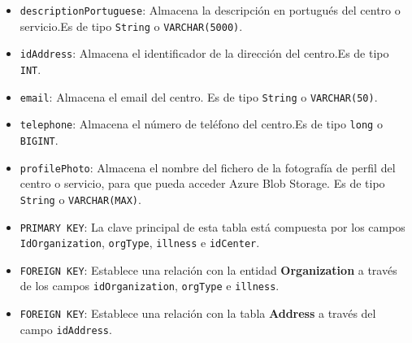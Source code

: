 \begin{itemize}
\begin{itemize}
        \item \texttt{descriptionPortuguese}: Almacena la descripción en portugués del centro o servicio.Es de tipo \texttt{String} o \texttt{VARCHAR(5000)}.        
        \item \texttt{idAddress}: Almacena el identificador de la dirección del centro.Es de tipo \texttt{INT}.
        \item \texttt{email}: Almacena el email del centro. Es de tipo \texttt{String} o \texttt{VARCHAR(50)}.
        \item \texttt{telephone}: Almacena el número de teléfono del centro.Es de tipo \texttt{long} o \texttt{BIGINT}.
        \item \texttt{profilePhoto}: Almacena el nombre del fichero de la fotografía de perfil del centro o servicio, para que pueda acceder Azure Blob Storage. Es de tipo \texttt{String} o \texttt{VARCHAR(MAX)}.
        \item \texttt{PRIMARY KEY}: La clave principal de esta tabla está compuesta por los campos \texttt{IdOrganization}, \texttt{orgType}, \texttt{illness} e \texttt{idCenter}.
        \item \texttt{FOREIGN KEY}: Establece una relación con la entidad \textbf{Organization} a través de los campos \texttt{idOrganization}, \texttt{orgType} e \texttt{illness}.
        \item \texttt{FOREIGN KEY}: Establece una relación con la tabla \textbf{Address} a través del campo \texttt{idAddress}.
        \end{itemize}


\end{itemize}
